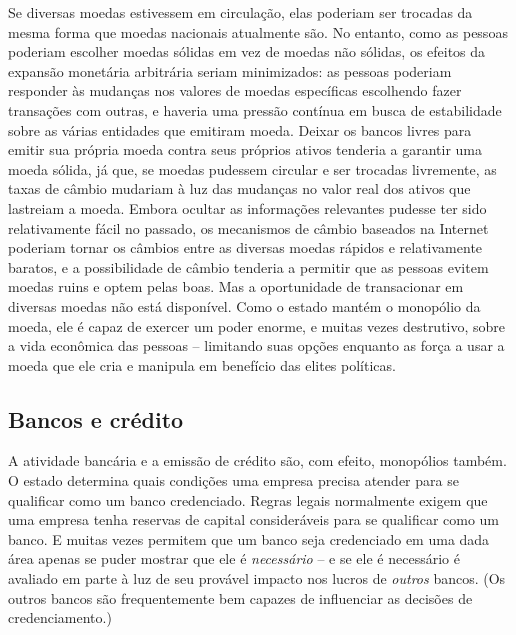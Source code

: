 Se diversas moedas estivessem em circulação, elas poderiam ser trocadas da mesma forma que moedas nacionais atualmente são. No entanto, como as pessoas poderiam escolher moedas sólidas em vez de moedas não sólidas, os efeitos da expansão monetária arbitrária seriam minimizados: as pessoas poderiam responder às mudanças nos valores de moedas específicas escolhendo fazer transações com outras, e haveria uma pressão contínua em busca de estabilidade sobre as várias entidades que emitiram moeda. Deixar os bancos livres para emitir sua própria moeda contra seus próprios ativos tenderia a garantir uma moeda sólida, já que, se moedas pudessem circular e ser trocadas livremente, as taxas de câmbio mudariam à luz das mudanças no valor real dos ativos que lastreiam a moeda. Embora ocultar as informações relevantes pudesse ter sido relativamente fácil no passado, os mecanismos de câmbio baseados na Internet poderiam tornar os câmbios entre as diversas moedas rápidos e relativamente baratos, e a possibilidade de câmbio tenderia a permitir que as pessoas evitem moedas ruins e optem pelas boas. Mas a oportunidade de transacionar em diversas moedas não está disponível. Como o estado mantém o monopólio da moeda, ele é capaz de exercer um poder enorme, e muitas vezes destrutivo, sobre a vida econômica das pessoas -- limitando suas opções enquanto as força a usar a moeda que ele cria e manipula em benefício das elites políticas.

\subsection*{Bancos e crédito}

A atividade bancária e a emissão de crédito são, com efeito, monopólios também. O estado determina quais condições uma empresa precisa atender para se qualificar como um banco credenciado. Regras legais normalmente exigem que uma empresa tenha reservas de capital consideráveis para se qualificar como um banco. E muitas vezes permitem que um banco seja credenciado em uma dada área apenas se puder mostrar que ele é \emph{necessário} -- e se ele é necessário é avaliado em parte à luz de seu provável impacto nos lucros de \emph{outros} bancos. (Os outros bancos são frequentemente bem capazes de influenciar as decisões de credenciamento.)

